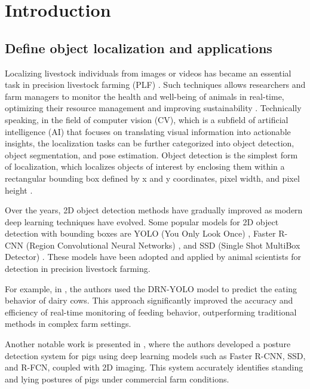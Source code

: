 \section{Introduction}

\subsection*{Define object localization and applications}

Localizing livestock individuals from images or videos has became an essential task in precision livestock farming (PLF) \cite{fernandes2020image}. Such techniques allows researchers and farm managers to monitor the health and well-being of animals in real-time, optimizing their resource management and improving sustainability \cite{morrone2022industry} \cite{hao2023cattle}. Technically speaking, in the field of computer vision (CV), which is a subfield of artificial intelligence (AI) that focuses on translating visual information into actionable insights, the localization tasks can be further categorized into object detection, object segmentation, and pose estimation. Object detection is the simplest form of localization, which localizes objects of interest by enclosing them within a rectangular bounding box defined by x and y coordinates, pixel width, and pixel height \cite{viola2001rapid}. 


Over the years, 2D object detection methods have gradually improved as modern deep learning techniques have evolved. Some popular models for 2D object detection with bounding boxes are YOLO (You Only Look Once) \cite{redmon2016you}, Faster R-CNN (Region Convolutional Neural Networks) \cite{girshick2015fast}, and SSD (Single Shot MultiBox Detector) \cite{liu2016ssd}. These models have been adopted and applied by animal scientists for detection in precision livestock farming.

For example, in \cite{yu2022automatic}, the authors used the DRN-YOLO model \cite{xu2020improved} to predict the eating behavior of dairy cows. This approach significantly improved the accuracy and efficiency of real-time monitoring of feeding behavior, outperforming traditional methods in complex farm settings.

Another notable work is presented in \cite{nasirahmadi2019deep}, where the authors developed a posture detection system for pigs using deep learning models such as Faster R-CNN, SSD, and R-FCN, coupled with 2D imaging. This system accurately identifies standing and lying postures of pigs under commercial farm conditions.

